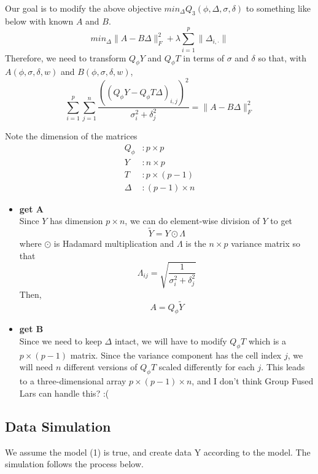 \documentclass[11pt]{article}
\begin{document}
\noindent Our goal is to modify the above objective $min_\Delta Q_3(\phi,\Delta,\sigma,\delta)$ to something like below with known $A$ and $B$.
\begin{equation}
min_\Delta  \| A - B \Delta\|_F^2 + \lambda \sum_{i=1}^{p} \| \Delta_{i, \cdot}\|
\end{equation}
Therefore, we need to transform $Q_{\phi}Y$ and $Q_{\phi}T$ in terms of $\sigma$ and $\delta$ so that, with $A(\phi, \sigma, \delta, w)$ and $B(\phi, \sigma, \delta, w)$,
\begin{equation}
\sum_{i=1}^{p} \sum_{j=1}^{n} \frac{ \left((Q_{\phi}Y - Q_{\phi} T \Delta)_{i,j}\right)^2}{\sigma_i^2 + \delta_j^2}
=
\|A-B\Delta\|_F^2
\end{equation}

\noindent Note the dimension of the matrices
\begin{align*}
Q_{\phi} &: p \times p\\
Y &: n \times p\\
T &: p \times (p-1)\\
\Delta &: (p-1) \times n
\end{align*}

\begin{itemize}
\item \textbf{get A}\\
Since $Y$ has dimension $p \times n$, we can do element-wise division of $Y$ to get $$\tilde{Y} = Y \odot \Lambda$$
where $\odot$ is Hadamard multiplication and $\Lambda$ is the $n \times p$ variance matrix so that $$\Lambda_{ij} = \sqrt{\frac{1}{\sigma_i^2 + \delta_j^2}}$$
Then, $$A = Q_{\phi} \tilde{Y}$$
\item \textbf{get B}\\
\noindent
Since we need to keep $\Delta$ intact, we will have to modify $Q_{\phi}T$ which is a $p \times (p-1)$ matrix. Since the variance component has the cell index $j$, we will need $n$ different versions of $Q_{\phi}T$ scaled differently for each $j$. This leads to a three-dimensional array $p \times (p-1) \times n$, and I don't think Group Fused Lars can handle this? :(




\end{itemize}
\subsection*{Data Simulation}
We assume the model (1) is true, and create data Y according to the model. The simulation follows the process below.
\end{document}
